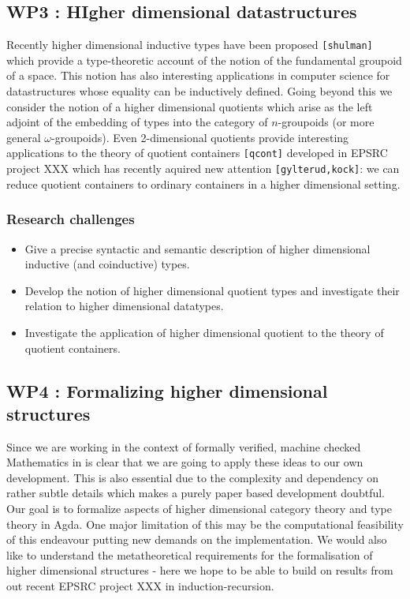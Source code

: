 \documentclass[a4paper]{article}
\renewcommand{\cite}[1]{{\tt[#1]}}
\begin{document}
\subsection*{WP3 : HIgher dimensional datastructures}

Recently higher dimensional inductive types have been proposed
\cite{shulman} which provide a type-theoretic account of the notion of
the fundamental groupoid of a space. This notion has also interesting
applications in computer science for datastructures whose equality can
be inductively defined. Going beyond this we consider the notion of a
higher dimensional quotients which arise as the left adjoint of the
embedding of types into the category of $n$-groupoids (or more general
$\omega$-groupoids). Even 2-dimensional quotients provide interesting
applications to the theory of quotient containers \cite{qcont}
developed in EPSRC project XXX which has recently aquired new
attention \cite{gylterud,kock}: we can reduce quotient containers to
ordinary containers in a higher dimensional setting. 

\subsubsection*{Research challenges}

\begin{itemize}
\item Give a precise syntactic and semantic description of higher
  dimensional inductive (and coinductive) types.
\item Develop the notion of higher dimensional quotient types and
  investigate their relation to higher dimensional datatypes.
\item Investigate the application of higher dimensional quotient to
  the theory of quotient containers.
\end{itemize}


\subsection*{WP4 : Formalizing higher dimensional structures} 
\label{sec:wp:qio}

Since we are working in the context of formally verified, machine
checked Mathematics in is clear that we are going to apply these ideas
to our own development. This is also essential due to the complexity
and dependency on rather subtle details which makes a purely paper
based development doubtful. Our goal is to formalize aspects of higher
dimensional category theory and type theory in Agda. One major
limitation of this may be the computational feasibility of this
endeavour putting new demands on the implementation. We would also
like to understand the metatheoretical requirements for the
formalisation of higher dimensional structures - here we hope to be
able to build on results from out recent EPSRC project XXX in
induction-recursion. 
\end{document}
